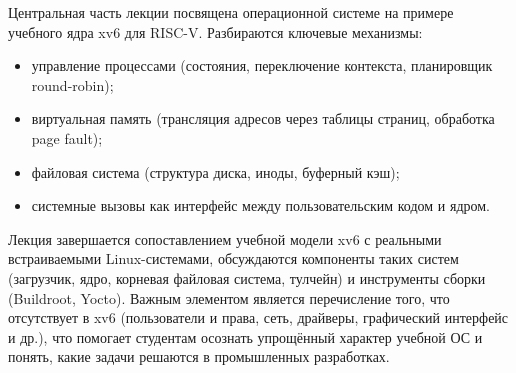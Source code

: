 Центральная часть лекции посвящена операционной системе на примере учебного ядра xv6 для RISC-V. Разбираются ключевые механизмы:
\begin{itemize}
    \item управление процессами (состояния, переключение контекста, планировщик round-robin);
    \item виртуальная память (трансляция адресов через таблицы страниц, обработка page fault);
    \item файловая система (структура диска, иноды, буферный кэш);
    \item системные вызовы как интерфейс между пользовательским кодом и ядром.
\end{itemize}

Лекция завершается сопоставлением учебной модели xv6 с реальными встраиваемыми Linux-системами, обсуждаются компоненты таких систем (загрузчик, ядро, корневая файловая система, тулчейн) и инструменты сборки (Buildroot, Yocto). Важным элементом является перечисление того, что отсутствует в xv6 (пользователи и права, сеть, драйверы, графический интерфейс и др.), что помогает студентам осознать упрощённый характер учебной ОС и понять, какие задачи решаются в промышленных разработках.